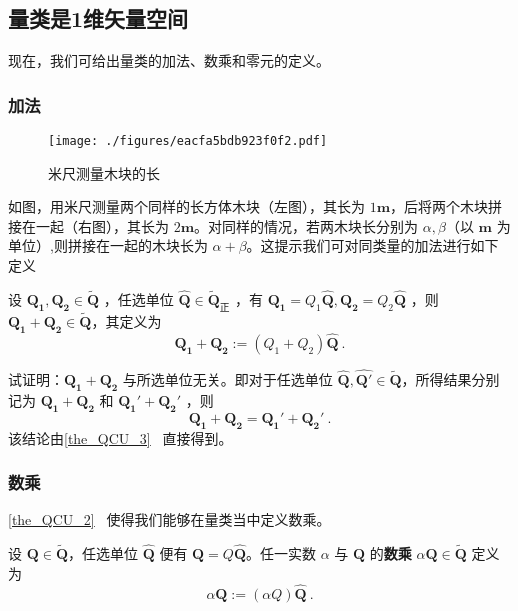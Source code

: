 \subsection{量类是1维矢量空间}
现在，我们可给出量类的加法、数乘和零元的定义。
\subsubsection{加法}
\begin{figure}[ht]
\centering
\texttt{[image: ./figures/eacfa5bdb923f0f2.pdf]}
\caption{米尺测量木块的长} \label{fig_QCC_1}
\end{figure}
如图，用米尺测量两个同样的长方体木块（左图），其长为 $1\boldsymbol{m}$，后将两个木块拼接在一起（右图），其长为 $2\boldsymbol{m}$。对同样的情况，若两木块长分别为 $\alpha ,\beta$（以 $\boldsymbol{m}$ 为单位）,则拼接在一起的木块长为 $\alpha+\beta$。这提示我们可对同类量的加法进行如下定义
\begin{definition}{}
设 $\boldsymbol{Q_1},\boldsymbol{Q_2}\in \tilde{\boldsymbol{Q}}$ ，任选单位 $\hat{\boldsymbol{Q}}\in\tilde{\boldsymbol{Q}}_{\text{正}}$ ，有 $\boldsymbol{Q_1}=Q_1\hat{\boldsymbol{Q}}, \boldsymbol{Q_2}=Q_2\hat{\boldsymbol{Q}}$ ，则 $\boldsymbol{Q_1}+\boldsymbol{Q_2}\in\tilde{\boldsymbol{Q}}$，其定义为
\begin{equation}
\boldsymbol{Q_1}+\boldsymbol{Q_2}:=(Q_1+Q_2)\hat{\boldsymbol{Q}}~.
\end{equation}
\end{definition}
\begin{example}{}
试证明：$\boldsymbol{Q_1}+\boldsymbol{Q_2}$ 与所选单位无关。即对于任选单位 $\hat{\boldsymbol{Q}},\hat{\boldsymbol{Q'}}\in\tilde{\boldsymbol{Q}}$，所得结果分别记为 $\boldsymbol{Q_1}+\boldsymbol{Q_2}$ 和 $\boldsymbol{Q_1}'+\boldsymbol{Q_2}'$ ，则
\begin{equation}
\boldsymbol{Q_1}+\boldsymbol{Q_2} =\boldsymbol{Q_1}'+\boldsymbol{Q_2}'~.
\end{equation}
 该结论由\autoref{the_QCU_3}~ 直接得到。
\end{example}
\subsubsection{数乘}
\autoref{the_QCU_2}~ 使得我们能够在量类当中定义数乘。
\begin{definition}{}
设 $\boldsymbol{Q}\in\tilde{\boldsymbol{Q}}$，任选单位 $\hat{\boldsymbol{Q}}$ 便有 $\boldsymbol{Q}=Q\hat{\boldsymbol{Q}}$。任一实数 $\alpha$ 与 $\boldsymbol{Q}$ 的\textbf{数乘} $\alpha\boldsymbol{Q}\in\tilde{\boldsymbol{Q}}$ 定义为
\begin{equation}
\alpha\boldsymbol{Q}:=(\alpha Q)\hat{\boldsymbol{Q}}~.
\end{equation}
\end{definition}
